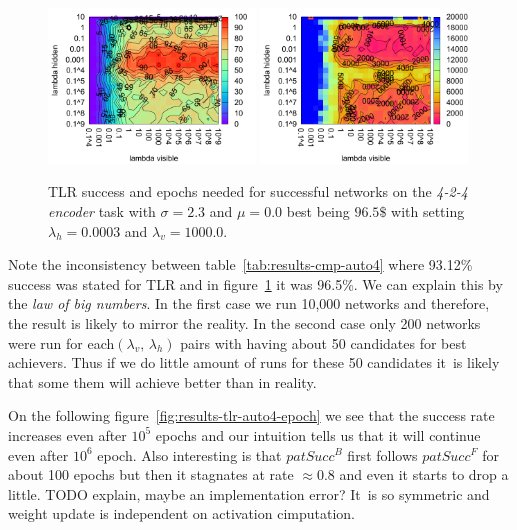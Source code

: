 \begin{figure}[H]
  \centering
  \includegraphics[width=0.49\textwidth]{img/tlr-auto4-success.pdf}   
  \includegraphics[width=0.49\textwidth]{img/tlr-auto4-epoch.pdf}     
  \caption{TLR success and epochs needed for successful networks on the \emph{4-2-4 encoder} task with $\sigma = 2.3$ and $\mu = 0.0$ best being $96.5\$$ with setting $\lambda_h=0.0003$ and $\lambda_v=1000.0$.}
  \label{fig:results-tlr-auto4-performance}
\end{figure}

Note the inconsistency between table~\ref{tab:results-cmp-auto4} where 93.12\% success was stated for TLR and in figure~\ref{fig:results-tlr-auto4-performance} it was 96.5\%. We can explain this by the \emph{law of big numbers}. In the first case we run 10,000 networks and therefore, the result is likely to mirror the reality. In the second case only 200 networks were run for each$(\lambda_v,\,\lambda_h)$ pairs with having about 50 candidates for best achievers. Thus if we do little amount of runs for these 50 candidates it~is likely that some them will achieve better than in reality. 

On the following figure~\ref{fig:results-tlr-auto4-epoch} we see that the success rate increases even after $10^5$ epochs and our intuition tells us that it will continue even after $10^6$ epoch. Also interesting is that $patSucc^B$ first follows $patSucc^F$ for about 100 epochs but then it stagnates at rate $\approx0.8$ and even it starts to drop a little. TODO explain, maybe an implementation error? It~is so symmetric and weight update is independent on activation cimputation. 

